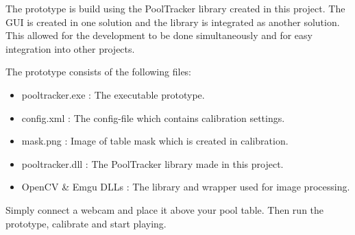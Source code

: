 The prototype is build using the PoolTracker library created in this project. The GUI is created in one solution and the library is integrated as another solution. This allowed for the development to be done simultaneously and for easy integration into other projects.

The prototype consists of the following files:
\begin{itemize}
\setlength{\itemsep}{0mm}
	\item pooltracker.exe : The executable prototype.
	\item config.xml	  : The config-file which contains calibration settings.
	\item mask.png		  : Image of table mask which is created in calibration.
	\item pooltracker.dll : The PoolTracker library made in this project.
	\item OpenCV \& Emgu DLLs  : The library and wrapper used for image processing.
\end{itemize}

Simply connect a webcam and place it above your pool table. Then run the prototype, calibrate and start playing.